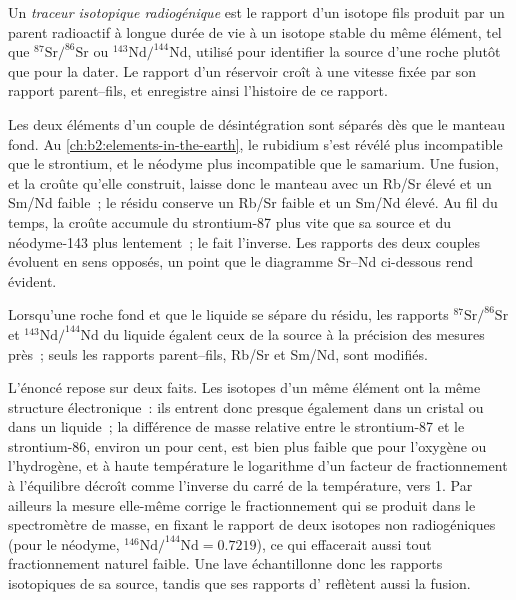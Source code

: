 \begin{definition}\label{def:b2:isotope-geochemistry:tracer}
Un \emph{traceur isotopique radiogénique} est le rapport
d'un isotope fils produit par un parent radioactif à longue durée de vie à un
isotope stable du même élément, tel que $^{87}\mathrm{Sr}/^{86}\mathrm{Sr}$ ou
$^{143}\mathrm{Nd}/^{144}\mathrm{Nd}$, utilisé pour identifier la source d'une roche plutôt
que pour la dater. Le rapport d'un réservoir croît à une vitesse fixée par son
rapport parent--fils, et enregistre ainsi l'histoire de ce rapport.
\end{definition}

Les deux éléments d'un couple de désintégration sont séparés dès que le manteau fond. Au
\cref{ch:b2:elements-in-the-earth}, le rubidium s'est révélé plus incompatible que
le strontium, et le néodyme plus incompatible que le samarium. Une fusion, et la croûte
qu'elle construit, laisse donc le manteau avec un Rb/Sr élevé et un Sm/Nd faible~;
le résidu conserve un Rb/Sr faible et un Sm/Nd élevé. Au fil du temps, la croûte
accumule du strontium-87 plus vite que sa source et du néodyme-143 plus lentement~;
le  fait l'inverse. Les rapports des deux couples évoluent
en sens opposés, un point que le diagramme Sr--Nd ci-dessous rend évident.

\begin{proposition}\label{prop:b2:isotope-geochemistry:melting}
Lorsqu'une roche fond et que le liquide se sépare du résidu, les
rapports $^{87}\mathrm{Sr}/^{86}\mathrm{Sr}$ et $^{143}\mathrm{Nd}/^{144}\mathrm{Nd}$ du liquide
égalent ceux de la source à la précision des mesures près~;
seuls les rapports parent--fils, Rb/Sr et Sm/Nd, sont modifiés.
\end{proposition}
\admitted

\noindent L'énoncé repose sur deux faits. Les isotopes d'un même élément ont la
même structure électronique~: ils entrent donc presque également dans un cristal ou dans un liquide~; la
différence de masse relative entre le strontium-87 et le strontium-86, environ un pour
cent, est bien plus faible que pour l'oxygène ou l'hydrogène, et à haute température le
logarithme d'un facteur de fractionnement à l'équilibre décroît comme l'inverse du carré de
la température, vers 1. Par ailleurs la mesure elle-même corrige le fractionnement
qui se produit dans le spectromètre de masse, en fixant le rapport de deux isotopes
non radiogéniques (pour le néodyme, $^{146}\mathrm{Nd}/^{144}\mathrm{Nd} =
0.7219$), ce qui effacerait aussi tout fractionnement naturel faible. Une lave
échantillonne donc les rapports isotopiques de sa source, tandis que ses rapports
d' reflètent aussi la fusion.

